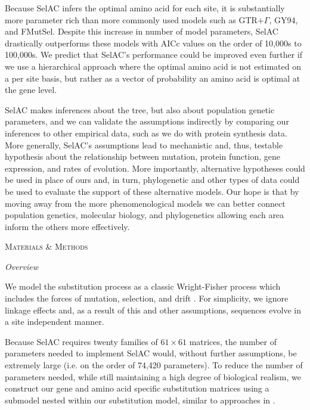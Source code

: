 \documentclass[12pt,letterpaper,fleqn]{article}
\renewcommand{\section}[1]{%
\bigskip
\begin{center}
\begin{Large}
\normalfont\scshape #1
\medskip
\end{Large}
\end{center}}
\renewcommand{\subsection}[1]{%
\bigskip
\begin{center}
\begin{large}
\normalfont\itshape #1
\end{large}
\end{center}}
\newcommand{\selac}{SelAC\xspace}
\begin{document}
Because \selac infers the optimal amino acid for each site, it is substantially more parameter rich than more commonly used models such as GTR$+\Gamma$, GY94, and FMutSel.
Despite this increase in number of model parameters, \selac drastically outperforms these models with AICc values on the order of 10,000s to 100,000s.
We predict that \selac's performance could be improved even further if we use a hierarchical approach where the optimal amino acid is not estimated on a per site basis, but rather as a vector of probability an amino acid is optimal at the gene level.

\selac makes inferences about the tree, but also about population genetic parameters, and we can validate the assumptions indirectly by comparing our inferences to other empirical data, such as we do with protein synthesis data.
More generally, \selac's assumptions lead to mechanistic and, thus, testable hypothesis about the relationship between mutation, protein function, gene expression, and rates of evolution.
More importantly, alternative hypotheses could be used in place of ours and, in turn, phylogenetic and other types of data could be used to evaluate the support of these alternative models.
Our hope is that by moving away from the more phenomenological models we can better connect population genetics, molecular biology, and phylogenetics allowing each area inform the others more effectively.



\section{Materials \& Methods}
\subsection{Overview}
We model the substitution process as a classic Wright-Fisher process which includes the forces of mutation, selection, and drift \citep{Fisher1930,Kimura1962,Wright1969,Iwasa1988,BergAndLassig2003,SellaAndHirsh2005,McCandlishAndStoltzfus2014}.
For simplicity, we ignore linkage effects and, as a result of this and other assumptions, sequences evolve in  a site independent manner.

Because \selac requires twenty families of $61 \times 61$ matrices, the number of parameters needed to implement \selac would, without further assumptions, be extremely large (i.e. on the order of 74,420 parameters).
To reduce the number of parameters needed, while still maintaining a high degree of biological realism, we construct our gene and amino acid specific substitution matrices using a submodel nested within our substitution model, similar to approaches in \citet{Gilchrist2007,ShahAndGilchrist2011,GilchristEtAl2015}.
\end{document}
